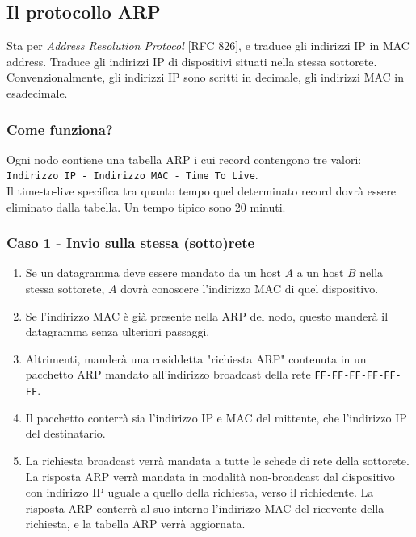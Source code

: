 \subsection{Il protocollo ARP}
Sta per \textit{Address Resolution Protocol} [RFC 826], e traduce gli indirizzi IP in MAC address. Traduce gli indirizzi IP di dispositivi situati nella stessa sottorete. Convenzionalmente, gli indirizzi IP sono scritti in decimale, gli indirizzi MAC in esadecimale.

\subsubsection{Come funziona?}
Ogni nodo contiene una tabella ARP i cui record contengono tre valori: \\ \verb|Indirizzo IP - Indirizzo MAC - Time To Live|.\\
Il time-to-live specifica tra quanto tempo quel determinato record dovrà essere eliminato dalla tabella. Un tempo tipico sono 20 minuti.


\subsubsection{Caso 1 - Invio sulla stessa (sotto)rete}

\begin{enumerate}
	\item Se un datagramma deve essere mandato da un host $A$ a un host $B$ nella stessa sottorete, $A$ dovrà conoscere l'indirizzo MAC di quel dispositivo. 
	
	\item Se l'indirizzo MAC è già presente nella ARP del nodo, questo manderà il datagramma senza ulteriori passaggi.
	
	\item Altrimenti, manderà una cosiddetta "richiesta ARP" contenuta in un pacchetto ARP mandato all'indirizzo broadcast della rete \verb|FF-FF-FF-FF-FF-FF|.
	
	\item Il pacchetto conterrà sia l'indirizzo IP e MAC del mittente, che l'indirizzo IP del destinatario.
	
	\item La richiesta broadcast verrà mandata a tutte le schede di rete della sottorete. La risposta ARP verrà mandata in modalità non-broadcast dal dispositivo con indirizzo IP uguale a quello della richiesta, verso il richiedente. La risposta ARP conterrà al suo interno l'indirizzo MAC del ricevente della richiesta, e la tabella ARP verrà aggiornata.
\end{enumerate}

